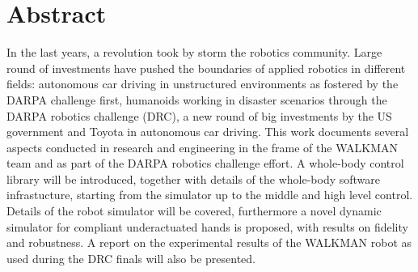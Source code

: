 %
\chapter*{Abstract}
\label{sec:abstract}
\vspace*{-10mm}
In the last years, a revolution took by  storm the robotics community. Large round of investments have pushed the boundaries of applied robotics in different fields: autonomous car driving in unstructured environments as fostered by the DARPA challenge first, humanoids working in disaster scenarios through the DARPA robotics challenge (DRC), a new round of big investments by the US government and Toyota in autonomous car driving. This work documents several aspects conducted in research and engineering in the frame of the WALKMAN team and as part of the DARPA robotics challenge effort. A whole-body control library will be introduced, together with details of the whole-body software infrastucture, starting from the simulator up to the middle and high level control. Details of the robot simulator will be covered, furthermore a novel dynamic simulator for compliant underactuated hands is proposed, with results on fidelity and robustness. A report on the experimental results of the WALKMAN robot as used during the DRC finals will also be presented.

\vspace*{20mm}


